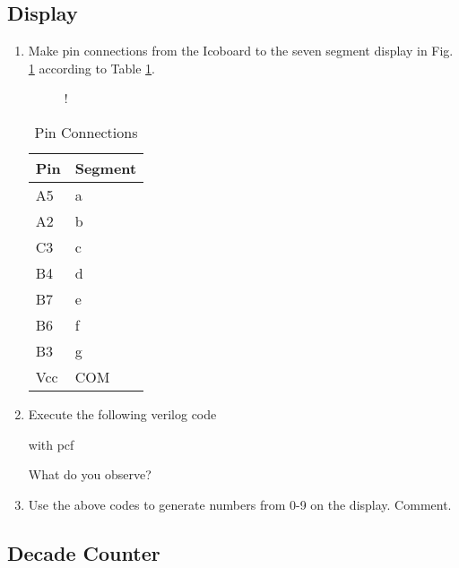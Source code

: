 \documentclass[journal,12pt,twocolumn]{IEEEtran}
\begin{document}
\subsection{Display}
\begin{enumerate}
\item    Make pin connections from the Icoboard to the seven segment display in Fig. \ref{fig:sevenseg} according to Table \ref{table:2}.

\begin{figure}[!h]
\begin{center}
\resizebox {0.5\columnwidth} {!} {

}
\end{center}
\caption{}
\label{fig:sevenseg}
\end{figure}

\begin{table}   
\begin{center}
\begin{tabular}{ | m{3em} | m{2cm}| } 
\hline
Pin & Segment   \\\hline
A5 & a   \\ \hline
A2 & b    \\\hline
C3 & c  \\\hline
B4 & d\\\hline
B7 & e  \\\hline
B6 & f  \\\hline
B3 & g  \\\hline
Vcc & COM \\\hline

\end{tabular}
\end{center}
\caption{Pin Connections}
\label{table:2}

\end{table}

\item Execute the following verilog code
    
with  pcf
    
%
What do you observe?
\item Use the above codes to generate numbers from 0-9 on the display. Comment.
\end{enumerate}
\subsection{Decade Counter}
\end{document}
